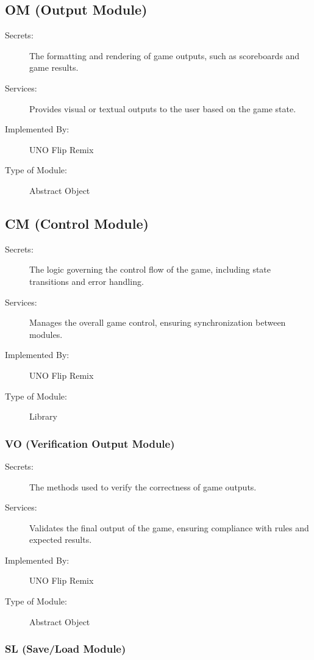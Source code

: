 \documentclass[12pt, titlepage]{article}
\begin{document}
\subsection{OM (Output Module)} \label{mOM}

\begin{description}
\item[Secrets:] The formatting and rendering of game outputs, such as scoreboards and game results.
\item[Services:] Provides visual or textual outputs to the user based on the game state.
\item[Implemented By:] UNO Flip Remix
\item[Type of Module:] Abstract Object
\end{description}

\subsection{CM (Control Module)} \label{mCM}

\begin{description}
\item[Secrets:] The logic governing the control flow of the game, including state transitions and error handling.
\item[Services:] Manages the overall game control, ensuring synchronization between modules.
\item[Implemented By:] UNO Flip Remix
\item[Type of Module:] Library
\end{description}

\subsubsection{VO (Verification Output Module)} \label{mVO}

\begin{description}
\item[Secrets:] The methods used to verify the correctness of game outputs.
\item[Services:] Validates the final output of the game, ensuring compliance with rules and expected results.
\item[Implemented By:] UNO Flip Remix
\item[Type of Module:] Abstract Object
\end{description}

\subsubsection{SL (Save/Load Module)} \label{mSL}
\end{document}
